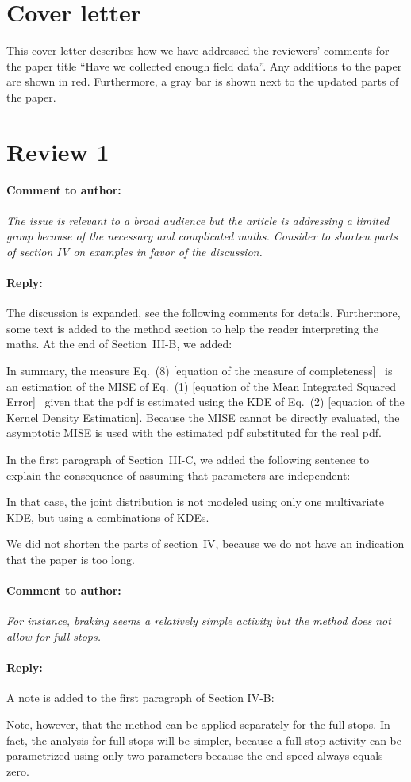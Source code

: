 \documentclass[10pt,final,a4paper,oneside,onecolumn]{article}
\newcommand{\toauthor}{\paragraph*{Comment to author:} \itshape}
\newcommand{\fromauthor}{\paragraph*{Reply:} \normalfont}
\newcommand{\additionend}[1]{\color{black}[#1]\color{red}}
\newcommand{\addition}[1]{\additionend{#1}\ }
\newcommand{\cstart}{\cbstart\color{red}}
\newcommand{\cend}{\cbend\color{black}}
\begin{document}
	
\section*{Cover letter}

This cover letter describes how we have addressed the reviewers' comments for the paper title ``Have we collected enough field data''. Any additions to the paper are shown in \color{red}red\color{black}. Furthermore, a gray bar is shown next to the updated parts of the paper.
	
\section*{Review 1}

\toauthor The issue is relevant to a broad audience but the article is addressing a limited group because of the necessary and complicated maths. Consider to shorten parts of section IV on examples in favor of the discussion. 

\fromauthor The discussion is expanded, see the following comments for details. Furthermore, some text is added to the method section to help the reader interpreting the maths. At the end of Section~III-B, we added:

\cstart
In summary, the measure Eq.\ (8) \addition{equation of the measure of completeness} is an estimation of the MISE of Eq.\ (1) \addition{equation of the Mean Integrated Squared Error} given that the pdf is estimated using the KDE of Eq.\ (2) \additionend{equation of the Kernel Density Estimation}. Because the MISE cannot be directly evaluated, the asymptotic MISE is used with the estimated pdf substituted for the real pdf. 
\cend

In the first paragraph of Section~III-C, we added the following sentence to explain the consequence of assuming that parameters are independent:

\cstart
In that case, the joint distribution is not modeled using only one multivariate KDE, but using a combinations of KDEs.
\cend

We did not shorten the parts of section~IV, because we do not have an indication that the paper is too long.

\toauthor For instance, braking seems a relatively simple activity but the method does not allow for full stops.

\fromauthor A note is added to the first paragraph of Section IV-B:

\cstart
Note, however, that the method can be applied separately for the full stops. In fact, the analysis for full stops will be simpler, because a full stop activity can be parametrized using only two parameters because the end speed always equals zero. 
\cend
\end{document}
